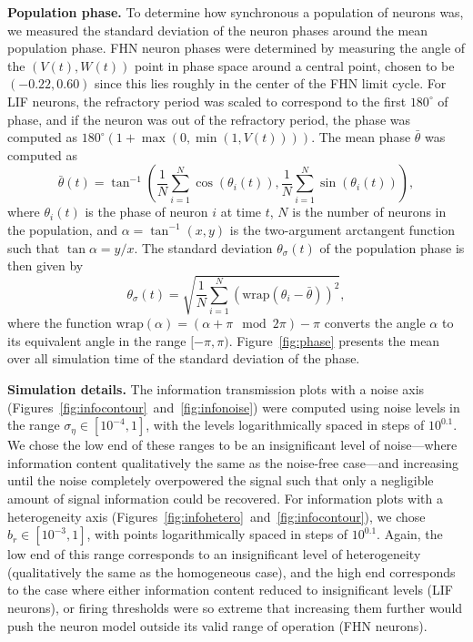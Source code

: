 \documentclass[12pt]{article}
\begin{document}
\textbf{Population phase.} To determine how synchronous a population of neurons was, we measured the standard deviation of the neuron phases around the mean population phase. FHN neuron phases were determined by measuring the angle of the $(V(t),W(t))$ point in phase space around a central point, chosen to be $(-0.22,0.60)$ since this lies roughly in the center of the FHN limit cycle. For LIF neurons, the refractory period was scaled to correspond to the first $180^\circ$ of phase, and if the neuron was out of the refractory period, the phase was computed as $180^\circ ( 1 + \max(0,\min(1,V(t))) )$. The mean phase $\bar\theta$ was computed as
\begin{equation}
  \bar\theta(t) = \tan^{-1} \left(
  \frac{1}{N}\sum\limits_{i=1}^N \cos\left(\theta_i(t)\right),
  \frac{1}{N}\sum\limits_{i=1}^N \sin\left(\theta_i(t)\right) \right),
\end{equation}
where $\theta_i(t)$ is the phase of neuron $i$ at time $t$, $N$ is the number of neurons in the population, and $\alpha = \tan^{-1}(x,y)$ is the two-argument arctangent function such that $\tan\alpha = y/x$. The standard deviation $\theta_\sigma(t)$ of the population phase is then given by
\begin{equation}
  \theta_\sigma(t) = \sqrt{ \frac{1}{N} \sum\limits_{i=1}^N (\mathrm{wrap}(\theta_i - \bar\theta))^2 },
\end{equation}
where the function $\mathrm{wrap}(\alpha) = (\alpha + \pi \mod 2\pi) - \pi$ converts the angle $\alpha$ to its equivalent angle in the range $[-\pi,\pi)$. Figure~\ref{fig:phase} presents the mean over all simulation time of the standard deviation of the phase.

\textbf{Simulation details.} The information transmission plots with a noise axis (Figures~\ref{fig:infocontour}~and~\ref{fig:infonoise}) were computed using noise levels in the range $\sigma_\eta \in [10^{-4},1]$, with the levels logarithmically spaced in steps of $10^{0.1}$. We chose the low end of these ranges to be an insignificant level of noise---where information content qualitatively the same as the noise-free case---and increasing until the noise completely overpowered the signal such that only a negligible amount of signal information could be recovered. For information plots with a heterogeneity axis (Figures~\ref{fig:infohetero}~and~\ref{fig:infocontour}), we chose $b_r \in [10^{-3}, 1]$, with points logarithmically spaced in steps of $10^{0.1}$. Again, the low end of this range corresponds to an insignificant level of heterogeneity (qualitatively the same as the homogeneous case), and the high end corresponds to the case where either information content reduced to insignificant levels (LIF neurons), or firing thresholds were so extreme that increasing them further would push the neuron model outside its valid range of operation (FHN neurons).
\end{document}
